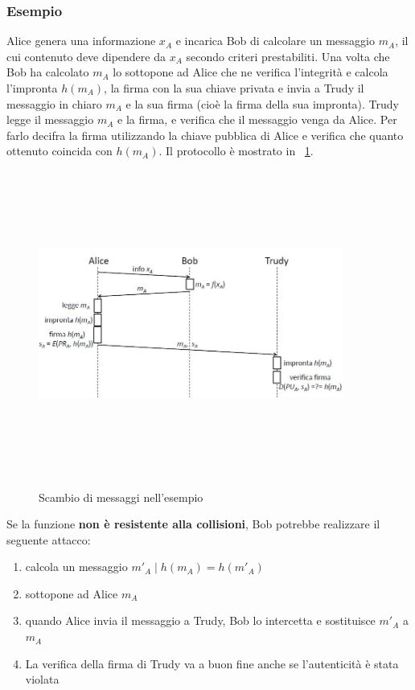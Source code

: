 \subsubsection{Esempio}
Alice genera una informazione $x_{A}$ e incarica Bob di calcolare un messaggio $m_{A}$, il cui contenuto deve dipendere da $x_{A}$ secondo criteri prestabiliti. Una volta che Bob ha calcolato $m_{A}$ lo sottopone ad Alice che ne verifica l'integrità e calcola l'impronta $h(m_{A})$, la firma con la sua chiave privata e invia a Trudy il messaggio in chiaro $m_{A}$ e la sua firma (cioè la firma della sua impronta). Trudy legge il messaggio $m_{A}$ e la firma, e verifica che il messaggio venga da Alice. Per farlo decifra la firma utilizzando la chiave pubblica di Alice e verifica che quanto ottenuto coincida con $h(m_{A})$. Il protocollo è mostrato in \figurename~\ref{fig:esempio_res_coll}.
\begin{figure}
	\begin{center}
	{\includegraphics[height=10cm, width=10cm, keepaspectratio]{Immagini/hash/schema_hash_collisioni.JPG}}
	\caption{Scambio di messaggi nell'esempio\label{fig:esempio_res_coll}}
	\end{center}
\end{figure}
Se la funzione \textbf{non è resistente alla collisioni}, Bob potrebbe realizzare il seguente attacco:
\begin{enumerate}
\item calcola un messaggio $m'_{A} \mid h(m_{A}) = h(m'_{A})$
\item sottopone ad Alice $m_{A}$
\item quando Alice invia il messaggio a Trudy, Bob lo intercetta e sostituisce $m'_{A}$ a $m_{A}$
\item La verifica della firma di Trudy va a buon fine anche se l'autenticità è stata violata
\end{enumerate}
